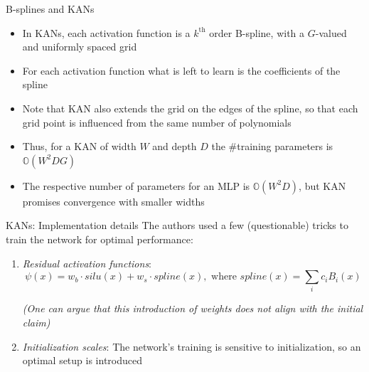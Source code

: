 \begin{frame}{B-splines and KANs}
    \begin{itemize}
        \item In KANs, each activation function is a $k^{\text{th}}$ order B-spline, with a $G$-valued and uniformly spaced grid  \vspace{0.3em}
        \item For each activation function what is left to learn is the coefficients of the spline \vspace{0.3em}
        \item Note that KAN also extends the grid on the edges of the spline, so that each grid point is influenced from the same number of polynomials \vspace{0.3em}
        \item Thus, for a KAN of width $W$ and depth $D$ the $\#$training parameters is $\mathbb{O}(W^2DG)$ \vspace{0.3em}
        \item The respective number of parameters for an MLP is $\mathbb{O}(W^2D)$, but KAN promises convergence with smaller widths \vspace{0.3em}
    \end{itemize}
\end{frame}

\begin{frame}{KANs: Implementation details}
    The authors used a few (questionable) tricks to train the network for optimal performance: \vspace{0.5em}
    \begin{enumerate}
        \item \textit{Residual activation functions}:
        $$\psi(x) = w_b\cdot silu(x) + w_s \cdot spline(x), \text{ where } spline(x) = \sum_i c_i B_i(x)$$
        \begin{center}
            \textit{\small \textcolor{blue!50!black}{(One can argue that this introduction of weights does not align with the initial claim)}} \vspace{1em}
        \end{center}
        \item \textit{Initialization scales}: The network's training is sensitive to initialization, so an optimal setup is introduced \vspace{1em}
    \end{enumerate}
\end{frame}

